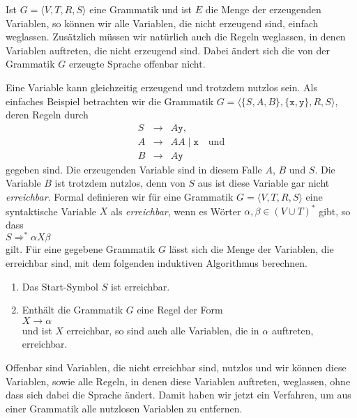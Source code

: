 \noindent
Ist $G = \langle V, T, R, S \rangle$ eine Grammatik und ist $E$ die Menge der erzeugenden Variablen,
so k\"onnen wir alle Variablen, die nicht erzeugend sind, einfach weglassen.  Zus\"atzlich m\"ussen wir
nat\"urlich auch die Regeln weglassen, in denen Variablen auftreten, die nicht erzeugend sind.  Dabei
\"andert sich die von der Grammatik $G$ erzeugte Sprache offenbar nicht.
\pagebreak

Eine Variable kann gleichzeitig erzeugend und trotzdem nutzlos sein.  Als einfaches
Beispiel betrachten wir die Grammatik  $G = \langle \{S, A, B \}, \{ \texttt{x}, \texttt{y} \}, R, S \rangle$, deren Regeln durch
\begin{eqnarray*}
  S & \rightarrow & A \texttt{y},           \\
  A & \rightarrow & A A \mid \texttt{x} \quad \mbox{und}    \\
  B & \rightarrow & A \texttt{y} 
\end{eqnarray*}
gegeben sind.  Die erzeugenden Variable sind in diesem Falle $A$, $B$ und $S$.  Die Variable
$B$ ist trotzdem nutzlos, denn von $S$ aus ist diese Variable gar nicht \emph{erreichbar}.
Formal definieren wir f\"ur eine Grammatik $G = \langle V, T, R, S \rangle$ eine syntaktische Variable $X$ als
\emph{erreichbar}, wenn es W\"orter $\alpha, \beta \in (V \cup T)^*$ gibt, so dass 
\\[0.2cm]
\hspace*{1.3cm}
$S \Rightarrow^* \alpha X \beta$
\\[0.2cm]
gilt. F\"ur eine gegebene Grammatik $G$  l\"asst sich die Menge der Variablen, die erreichbar
sind, mit dem folgenden 
induktiven Algorithmus berechnen.
\begin{enumerate}
\item Das Start-Symbol $S$ ist erreichbar.
\item Enth\"alt die Grammatik $G$ eine Regel der Form
      \\[0.2cm]
      \hspace*{1.3cm}
      $X \rightarrow \alpha$
      \\[0.2cm]
      und ist $X$ erreichbar, so sind auch alle Variablen, die in $\alpha$ auftreten, erreichbar.
\end{enumerate}
Offenbar sind Variablen, die nicht erreichbar sind, nutzlos und wir k\"onnen diese Variablen, sowie alle
Regeln, in denen diese Variablen auftreten, weglassen, ohne dass sich dabei die Sprache \"andert.
Damit haben wir jetzt ein Verfahren, um aus einer Grammatik alle nutzlosen Variablen zu entfernen.
